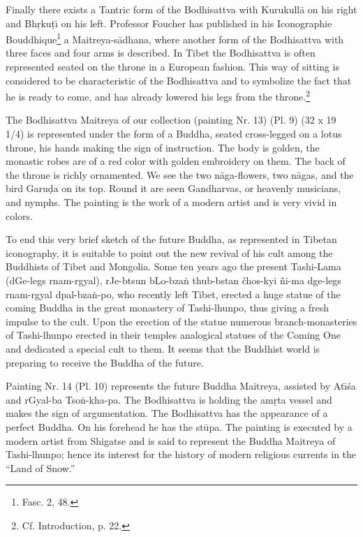 \documentclass[a4paper, 12pt, oneside]{article}
\begin{document}
Finally there exists a Tantric form of the Bodhisattva with Kurukull\={a} on his right and Bh\d{r}ku\d{t}\={\i} on his left. Professor Foucher has published in his Iconographie Bouddhique\footnote{Fasc. 2, 48.} a Maitreya-s\={a}dhana, where another form of the Bodhisattva with three faces and four arms is described. In Tibet the Bodhisattva is often represented seated on the throne in a European fashion. This way of sitting is considered to be characteristic of the Bodhisattva and to symbolize the fact that he is ready to come, and has already lowered his legs from the throne.\footnote{Cf. Introduction, p. 22.}

\bigskip

The Bodhisattva Maitreya of our collection (painting Nr. 13) (Pl. 9) (32 x 19 1/4) is represented under the form of a Buddha, seated cross-legged on a lotus throne, his hands making the sign of instruction. The body is golden, the monastic robes are of a red color with golden embroidery on them. The back of the throne is richly ornamented. We see the two n\={a}ga-flowers, two n\={a}gas, and the bird Garu\d{d}a on its top. Round it are seen Gandharvas, or heavenly musicians, and nymphs. The painting is the work of a modern artist and is very vivid in colors.

To end this very brief sketch of the future Buddha, as represented in Tibetan iconography, it is suitable to point out the new revival of his cult among the Buddhists of Tibet and Mongolia. Some ten years ago the present Tashi-Lama (dGe-legs rnam-rgyal), rJe-btsun bLo-bza\.{n} thub-bstan čhos-kyi \~{n}i-ma dge-legs rnam-rgyal dpal-bza\.{n}-po, who recently left Tibet, erected a huge statue of the coming Buddha in the great monastery of Tashi-lhunpo, thus giving a fresh impulse to the cult. Upon the erection of the statue numerous branch-monasteries of Tashi-lhunpo erected in their temples analogical statues of the Coming One and dedicated a special cult to them. It seems that the Buddhist world is preparing to receive the Buddha of the future.

\bigskip

Painting Nr. 14 (Pl. 10) represents the future Buddha Maitreya, assisted by At\={\i}\'{s}a and rGyal-ba Tso\.{n}-kha-pa. The Bodhisattva is holding the am\d{r}ta vessel and makes the sign of argumentation. The Bodhisattva has the appearance of a perfect Buddha. On his forehead he has the st\={u}pa. The painting is executed by a modern artist from Shigatse and is said to represent the Buddha Maitreya of Tashi-lhunpo; hence its interest for the history of modern religious currents in the ``Land of Snow.''
\end{document}
